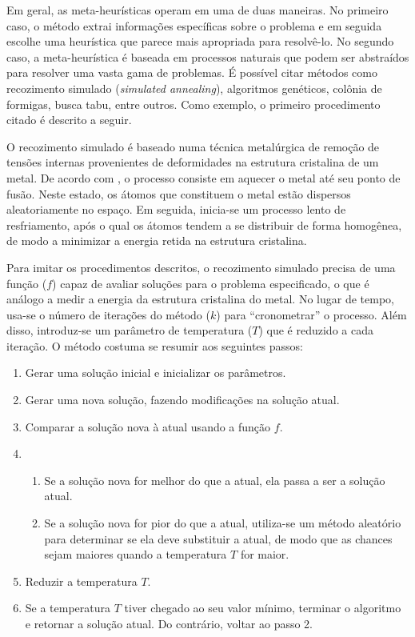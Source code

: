 Em geral, as meta-heurísticas operam em uma de duas maneiras. No primeiro caso, o método extrai informações específicas sobre o problema e em seguida escolhe uma heurística que parece mais apropriada para resolvê-lo. No segundo caso, a meta-heurística é baseada em processos naturais que podem ser abstraídos para resolver uma vasta gama de problemas. É possível citar métodos como recozimento simulado (\emph{simulated annealing}), algoritmos genéticos, colônia de formigas, busca tabu, entre outros. Como exemplo, o primeiro procedimento citado é descrito a seguir.

O recozimento simulado é baseado numa técnica metalúrgica de remoção de tensões internas provenientes de deformidades na estrutura cristalina de um metal. De acordo com \textcite{DELAHAYE2019}, o processo consiste em aquecer o metal até seu ponto de fusão. Neste estado, os átomos que constituem o metal estão dispersos aleatoriamente no espaço. Em seguida, inicia-se um processo lento de resfriamento, após o qual os átomos tendem a se distribuir de forma homogênea, de modo a minimizar a energia retida na estrutura cristalina.

Para imitar os procedimentos descritos, o recozimento simulado precisa de uma função ($f$) capaz de avaliar soluções para o problema especificado, o que é análogo a medir a energia da estrutura cristalina do metal. No lugar de tempo, usa-se o número de iterações do método ($k$) para ``cronometrar'' o processo. Além disso, introduz-se um parâmetro de temperatura ($T$) que é reduzido a cada iteração. O método costuma se resumir aos seguintes passos:

\begin{enumerate}
    \item Gerar uma solução inicial e inicializar os parâmetros.
    \item Gerar uma nova solução, fazendo modificações na solução atual.
    \item Comparar a solução nova à atual usando a função $f$.
    \item   \begin{enumerate}
                \item Se a solução nova for melhor do que a atual, ela passa a ser a solução atual.
                \item Se a solução nova for pior do que a atual, utiliza-se um método aleatório para determinar se ela deve substituir a atual, de modo que as chances sejam maiores quando a temperatura $T$ for maior.
            \end{enumerate}
    \item Reduzir a temperatura $T$.
    \item Se a temperatura $T$ tiver chegado ao seu valor mínimo, terminar o algoritmo e retornar a solução atual. Do contrário, voltar ao passo 2.
\end{enumerate}